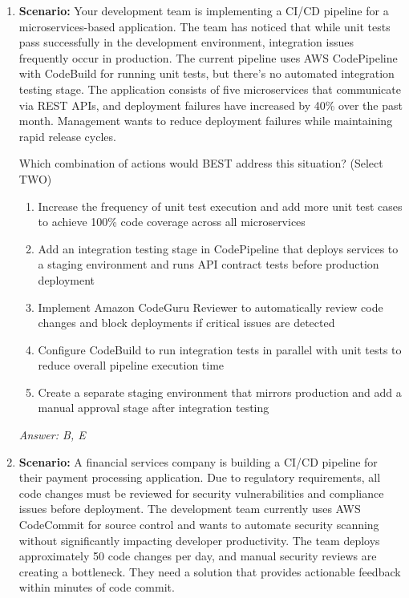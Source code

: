 \documentclass[12pt,a4paper]{article}
\begin{document}
\begin{enumerate}[label=\textbf{Q\arabic*.}]

\item \textbf{Scenario:} Your development team is implementing a CI/CD pipeline for a microservices-based application. The team has noticed that while unit tests pass successfully in the development environment, integration issues frequently occur in production. The current pipeline uses AWS CodePipeline with CodeBuild for running unit tests, but there's no automated integration testing stage. The application consists of five microservices that communicate via REST APIs, and deployment failures have increased by 40\% over the past month. Management wants to reduce deployment failures while maintaining rapid release cycles.

Which combination of actions would BEST address this situation? (Select TWO)

\begin{enumerate}[label=\Alph*.]
    \item Increase the frequency of unit test execution and add more unit test cases to achieve 100\% code coverage across all microservices
    \item Add an integration testing stage in CodePipeline that deploys services to a staging environment and runs API contract tests before production deployment
    \item Implement Amazon CodeGuru Reviewer to automatically review code changes and block deployments if critical issues are detected
    \item Configure CodeBuild to run integration tests in parallel with unit tests to reduce overall pipeline execution time
    \item Create a separate staging environment that mirrors production and add a manual approval stage after integration testing
\end{enumerate}

\textit{Answer: B, E}

\item \textbf{Scenario:} A financial services company is building a CI/CD pipeline for their payment processing application. Due to regulatory requirements, all code changes must be reviewed for security vulnerabilities and compliance issues before deployment. The development team currently uses AWS CodeCommit for source control and wants to automate security scanning without significantly impacting developer productivity. The team deploys approximately 50 code changes per day, and manual security reviews are creating a bottleneck. They need a solution that provides actionable feedback within minutes of code commit.


\end{enumerate}
\end{document}
